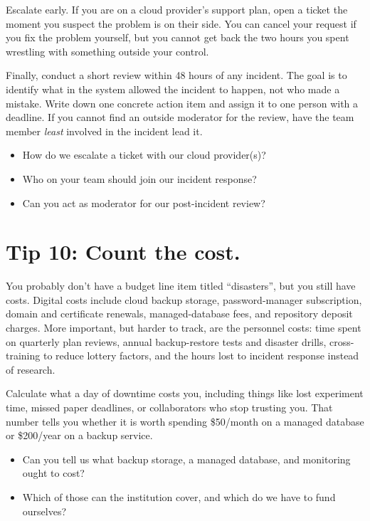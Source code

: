 \documentclass[10pt,letterpaper]{article}
\begin{document}
Escalate early. If you are on a cloud provider's support plan, open a ticket the
moment you suspect the problem is on their side. You can cancel your request if
you fix the problem yourself, but you cannot get back the two hours you spent
wrestling with something outside your control.

Finally, conduct a short review within 48 hours of any incident. The goal is to
identify what in the system allowed the incident to happen, not who made a
mistake. Write down one concrete action item and assign it to one person with a
deadline. If you cannot find an outside moderator for the review, have the team
member \emph{least} involved in the incident lead it.

\begin{notebox}
  \begin{itemize}
  \item How do we escalate a ticket with our cloud provider(s)?
  \item Who on your team should join our incident response?
  \item Can you act as moderator for our post-incident review?
  \end{itemize}
\end{notebox}

\section*{Tip 10: Count the cost.}

You probably don't have a budget line item titled ``disasters'', but you still
have costs.  Digital costs include cloud backup storage, password-manager
subscription, domain and certificate renewals, managed-database fees, and
repository deposit charges.  More important, but harder to track, are the
personnel costs: time spent on quarterly plan reviews, annual backup-restore
tests and disaster drills, cross-training to reduce lottery factors, and the
hours lost to incident response instead of research.

Calculate what a day of downtime costs you, including things like lost
experiment time, missed paper deadlines, or collaborators who stop trusting
you. That number tells you whether it is worth spending \$50/month on a managed
database or \$200/year on a backup service.

\begin{notebox}
  \begin{itemize}
  \item Can you tell us what backup storage, a managed database, and monitoring ought to cost?
  \item Which of those can the institution cover, and which do we have to fund ourselves?
  \end{itemize}
\end{notebox}
\end{document}
